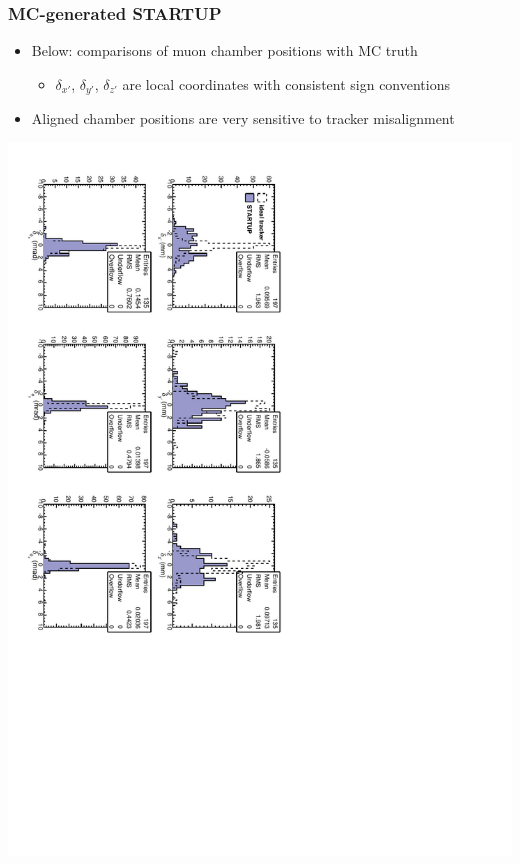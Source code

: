 \documentclass[compress]{beamer}
\begin{document}
\begin{frame}
\frametitle{MC-generated STARTUP}
\begin{itemize}
\item Below: comparisons of muon chamber positions with MC truth
\begin{itemize}
\item $\delta_{x'}$, $\delta_{y'}$, $\delta_{z'}$ are local coordinates with consistent sign conventions
\end{itemize}
\item Aligned chamber positions are very sensitive to tracker misalignment
\end{itemize}

\includegraphics[height=0.95\linewidth, angle=90]{startup_6dof_redo.pdf}
\end{frame}
\end{document}
